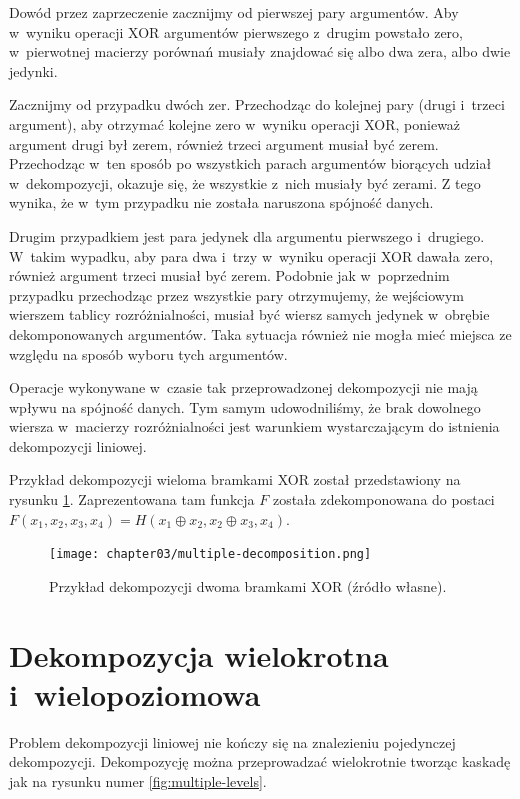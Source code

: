 Dowód przez zaprzeczenie zacznijmy od pierwszej pary argumentów.
Aby w~wyniku operacji XOR argumentów pierwszego z~drugim powstało zero,
w~pierwotnej macierzy porównań musiały znajdować się albo dwa zera,
albo dwie jedynki.

Zacznijmy od przypadku dwóch zer.
Przechodząc do kolejnej pary (drugi i~trzeci argument),
aby otrzymać kolejne zero w~wyniku operacji XOR,
ponieważ argument drugi był zerem,
również trzeci argument musiał być zerem.
Przechodząc w~ten sposób po wszystkich parach argumentów biorących udział w~dekompozycji,
okazuje się,
że wszystkie z~nich musiały być zerami.
Z tego wynika,
że w~tym przypadku nie została naruszona spójność danych.

Drugim przypadkiem jest para jedynek dla argumentu pierwszego i~drugiego.
W~takim wypadku,
aby para dwa i~trzy w~wyniku operacji XOR dawała zero,
również argument trzeci musiał być zerem.
Podobnie jak w~poprzednim przypadku przechodząc przez wszystkie pary otrzymujemy,
że wejściowym wierszem tablicy rozróżnialności,
musiał być wiersz samych jedynek w~obrębie dekomponowanych argumentów.
Taka sytuacja również nie mogła mieć miejsca ze względu na sposób wyboru tych argumentów.

Operacje wykonywane w~czasie tak przeprowadzonej dekompozycji nie mają wpływu na spójność danych.
Tym samym udowodniliśmy,
że brak dowolnego wiersza w~macierzy rozróżnialności jest warunkiem wystarczającym do istnienia dekompozycji liniowej.

Przykład dekompozycji wieloma bramkami XOR został przedstawiony na rysunku \ref{fig:multiple}.
Zaprezentowana tam funkcja $F$ została zdekomponowana do postaci $F(x_1, x_2, x_3, x_4) = H(x_1 \oplus x_2, x_2 \oplus x_3, x_4)$.

\begin{figure}[h]
\centering
\texttt{[image: chapter03/multiple-decomposition.png]}
\caption{Przykład dekompozycji dwoma bramkami XOR (źródło własne).}
\label{fig:multiple}
\end{figure}

\section{Dekompozycja wielokrotna i~wielopoziomowa}

Problem dekompozycji liniowej nie kończy się na znalezieniu pojedynczej dekompozycji.
Dekompozycję można przeprowadzać wielokrotnie tworząc kaskadę jak na rysunku numer \ref{fig:multiple-levels}.

